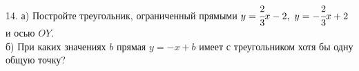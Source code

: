 14. а) Постройте треугольник, ограниченный прямыми $y=\cfrac{2}{3}x-2,\ y=-\cfrac{2}{3}x+2$ и осью $OY.$\\
б) При каких значениях $b$ прямая $y=-x+b$ имеет с треугольником хотя бы одну общую точку?\\
